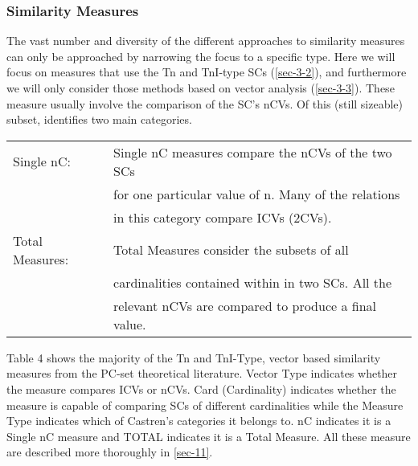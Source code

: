\documentclass{article}
\begin{document}
\subsubsection{Similarity Measures}
\label{sec-3-4-2}

The vast number and diversity of the different approaches to
similarity measures can only be approached by narrowing the focus to a
specific type. Here we will focus on measures that use the Tn and
TnI-type SCs (\ref{sec-3-2}), and furthermore we will only
consider those methods based on vector analysis (\ref{sec-3-3}). These measure usually involve the comparison of the SC's
nCVs. Of this (still sizeable) subset, \citet{Castren1994} identifies
two main categories.

\begin{center}
\begin{tabular}{ll}
 Single nC:       &  Single nC measures compare the nCVs of the two SCs    \\
                  &  for one particular value of n. Many of the relations  \\
                  &  in this category compare ICVs (2CVs).                 \\
 Total Measures:  &  Total Measures consider the subsets of all            \\
                  &  cardinalities contained within in two SCs. All the    \\
                  &  relevant nCVs are compared to produce a final value.  \\
\end{tabular}
\end{center}



Table 4 shows the majority of the Tn and TnI-Type, vector based
similarity measures from the PC-set theoretical literature. Vector
Type indicates whether the measure compares ICVs or nCVs. Card
(Cardinality) indicates whether the measure is capable of comparing
SCs of different cardinalities while the Measure Type indicates which
of Castren's categories it belongs to. nC indicates it is a Single nC
measure and TOTAL indicates it is a Total Measure. All these measure
are described more thoroughly in \ref{sec-11}.
\end{document}
